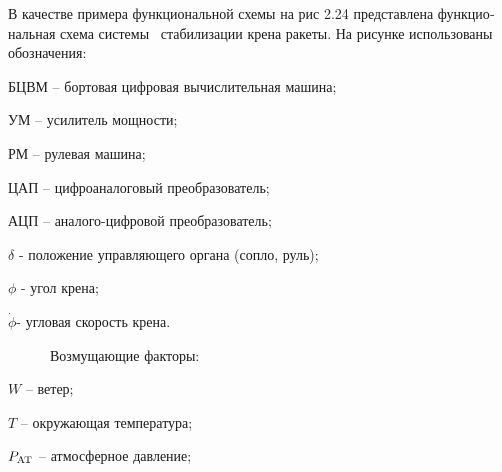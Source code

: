 \documentclass[a4paper]{article}
\newcommand\normalsubformula[1]{\text{\mathversion{normal}$#1$}}
\begin{document}
{\begin{russian}
\textsf{В качестве примера функциональной схемы на рис 2.24 представлена функциональная схема системы \ стабилизации
крена ракеты. На рисунке использованы обозначения:}
\end{russian}}

{\begin{russian}\sffamily
БЦВМ – бортовая цифровая вычислительная машина;
\end{russian}}

{\begin{russian}\sffamily
УМ – усилитель мощности;
\end{russian}}

{\begin{russian}\sffamily
РМ – рулевая машина;
\end{russian}}

{\begin{russian}\sffamily
ЦАП – цифроаналоговый преобразователь;
\end{russian}}

{\begin{russian}\sffamily
АЦП – аналого-цифровой преобразователь;
\end{russian}}

{\begin{russian}\sffamily
 $δ$ - положение управляющего органа (сопло, руль);
\end{russian}}

{\begin{russian}\sffamily
 $ϕ$ - угол крена;
\end{russian}}

{\begin{russian}\sffamily
 $\dot ϕ$- угловая скорость крена.
\end{russian}}

{\begin{russian}\sffamily
\ \ \ \ \ \ Возмущающие факторы:
\end{russian}}

{\begin{russian}\sffamily
 $W$ – ветер;
\end{russian}}

{\begin{russian}\sffamily
 $T$ – окружающая температура;
\end{russian}}

{\begin{russian}\sffamily
 $P_{\normalsubformula{\text{AT}}}$ – атмосферное давление;
\end{russian}}
\end{document}
